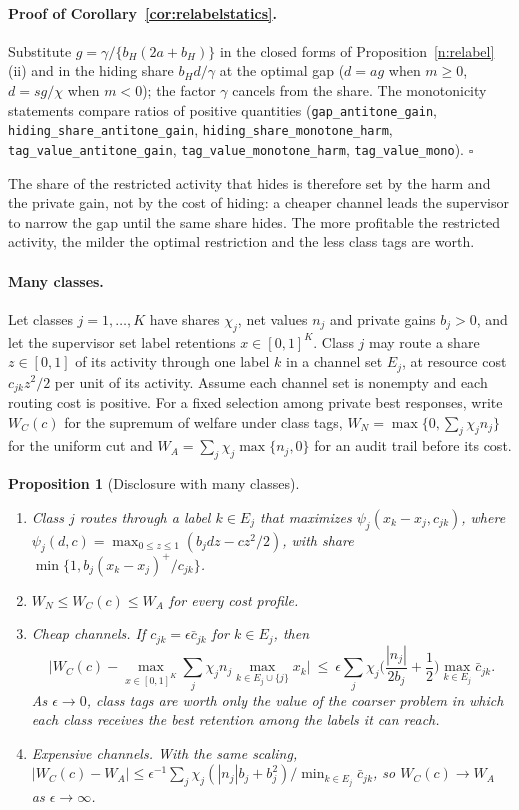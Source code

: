 \documentclass[12pt]{article}
\newtheorem{proposition}[theorem]{Proposition}
\theoremstyle{definition}
\theoremstyle{remark}
\begin{document}
\paragraph{Proof of Corollary~\ref{cor:relabelstatics}.} Substitute $g=\gamma/\{b_H(2a+b_H)\}$ in the closed forms of Proposition~\ref{n:relabel}(ii) and in the hiding share $b_Hd/\gamma$ at the optimal gap ($d=ag$ when $m\ge0$, $d=sg/\chi$ when $m<0$); the factor $\gamma$ cancels from the share. The monotonicity statements compare ratios of positive quantities (\nolinkurl{gap_antitone_gain}, \nolinkurl{hiding_share_antitone_gain}, \nolinkurl{hiding_share_monotone_harm}, \nolinkurl{tag_value_antitone_gain}, \nolinkurl{tag_value_monotone_harm}, \nolinkurl{tag_value_mono}). $\square$

The share of the restricted activity that hides is therefore set by the harm and the private gain, not by the cost of hiding: a cheaper channel leads the supervisor to narrow the gap until the same share hides. The more profitable the restricted activity, the milder the optimal restriction and the less class tags are worth.

\paragraph{Many classes.} Let classes $j=1,\ldots,K$ have shares $\chi_j$, net values $n_j$ and private gains $b_j>0$, and let the supervisor set label retentions $x\in[0,1]^K$. Class $j$ may route a share $z\in[0,1]$ of its activity through one label $k$ in a channel set $E_j$, at resource cost $c_{jk}z^2/2$ per unit of its activity. Assume each channel set is nonempty and each routing cost is positive. For a fixed selection among private best responses, write $W_C(c)$ for the supremum of welfare under class tags, $W_N=\max\{0,\sum_j\chi_jn_j\}$ for the uniform cut and $W_A=\sum_j\chi_j\max\{n_j,0\}$ for an audit trail before its cost.

\begin{proposition}[Disclosure with many classes]\label{prop:relabelK}
\begin{enumerate}[label=(\roman*),itemsep=1pt]
\item Class $j$ routes through a label $k\in E_j$ that maximizes $\psi_j(x_k-x_j,c_{jk})$, where $\psi_j(d,c)=\max_{0\le z\le1}(b_jdz-cz^2/2)$, with share $\min\{1,b_j(x_k-x_j)^+/c_{jk}\}$.
\item $W_N\le W_C(c)\le W_A$ for every cost profile.
\item \emph{Cheap channels.} If $c_{jk}=\epsilon\bar c_{jk}$ for $k\in E_j$, then
\[
\Big|W_C(c)-\max_{x\in[0,1]^K}\sum_j\chi_jn_j\max_{k\in E_j\cup\{j\}}x_k\Big|\ \le\ \epsilon\sum_j\chi_j\Big(\frac{|n_j|}{2b_j}+\frac12\Big)\max_{k\in E_j}\bar c_{jk}.
\]
As $\epsilon\to0$, class tags are worth only the value of the coarser problem in which each class receives the best retention among the labels it can reach.
\item \emph{Expensive channels.} With the same scaling, $|W_C(c)-W_A|\le\epsilon^{-1}\sum_j\chi_j(|n_j|b_j+b_j^2)/\min_{k\in E_j}\bar c_{jk}$, so $W_C(c)\to W_A$ as $\epsilon\to\infty$.
\end{enumerate}
\end{proposition}
\end{document}

